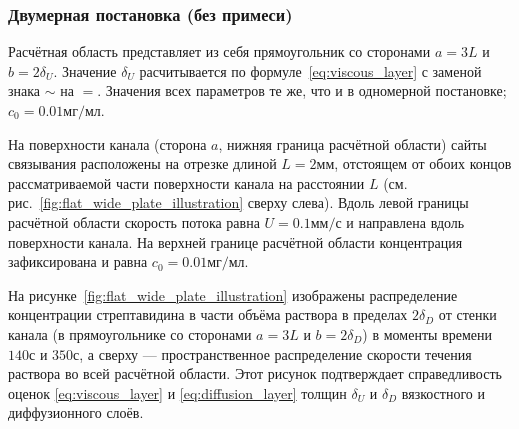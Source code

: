 \documentclass[oneside,final,12pt]{extreport}
\begin{document}
\subsubsection*{Двумерная постановка (без примеси)}

Расчётная область представляет из себя прямоугольник со сторонами
$a = 3 L$ и $b = 2 \delta_U$.
Значение $\delta_U$ расчитывается по формуле~\eqref{eq:viscous_layer}
с заменой знака $\sim$ на $=$.
Значения всех параметров те же, что и в одномерной постановке;
$c_0 = 0.01 \text{мг}/\text{мл}$.

На поверхности канала (сторона $a$, нижняя граница расчётной области)
сайты связывания расположены на отрезке
длиной $L = 2 \text{мм}$, отстоящем от обоих концов рассматриваемой части поверхности канала
на расстоянии $L$ (см. рис.~\ref{fig:flat_wide_plate_illustration} сверху слева).
Вдоль левой границы расчётной области скорость потока равна
$U = 0.1 \text{мм}/\text{с}$ и направлена вдоль поверхности канала.
На верхней границе расчётной области концентрация зафиксирована и равна
$c_0 = 0.01 \text{мг}/\text{мл}$.

На рисунке~\ref{fig:flat_wide_plate_illustration} изображены
распределение концентрации стрептавидина в части объёма раствора
в пределах $2 \delta_D$ от стенки канала
(в прямоугольнике со сторонами $a = 3 L$ и $b = 2 \delta_D$)
в моменты времени
$140\text{с}$ и $350\text{с}$,
а сверху --- пространственное распределение скорости течения раствора
во всей расчётной области.
Этот рисунок подтверждает справедливость оценок
\eqref{eq:viscous_layer} и \eqref{eq:diffusion_layer}
толщин $\delta_U$ и $\delta_D$ вязкостного и диффузионного слоёв.
\end{document}
